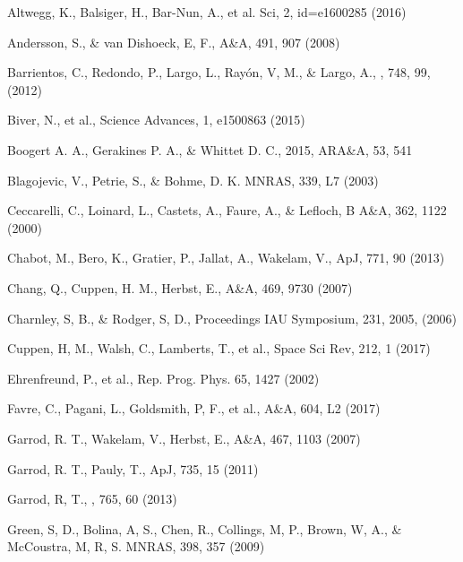 \documentclass{aastex61}
\begin{document}
\appendix


\begin{thebibliography}{}

 Altwegg, K., Balsiger, H., Bar-Nun, A., et al. Sci, 2, id=e1600285 (2016)

 Andersson, S., \& van Dishoeck, E, F., A\&A, 491, 907 (2008)

 Barrientos, C., Redondo, P., Largo, L., Ray\'{o}n, V, M., \& Largo, A., \apj, 748, 99, (2012)

 Biver, N., et al., Science Advances, 1, e1500863 (2015)

 Boogert A. A., Gerakines P. A., \& Whittet D. C., 2015, ARA\&A, 53, 541

 Blagojevic, V., Petrie, S., \& Bohme, D. K. MNRAS, 339, L7 (2003)

 Ceccarelli, C., Loinard, L., Castets, A., Faure, A., \& Lefloch, B A\&A, 362, 1122 (2000)

 Chabot, M., Bero, K., Gratier, P., Jallat, A., Wakelam, V., ApJ, 771, 90 (2013)

 Chang, Q., Cuppen, H. M., Herbst, E., A\&A, 469, 9730 (2007)

 Charnley, S, B., \& Rodger, S, D., Proceedings IAU Symposium, 231, 2005, (2006)

 Cuppen, H, M., Walsh, C., Lamberts, T., et al., Space Sci Rev, 212, 1 (2017)

 Ehrenfreund, P., et al., Rep. Prog. Phys. 65, 1427 (2002)

 Favre, C., Pagani, L., Goldsmith, P, F., et al., A\&A, 604, L2 (2017)

 Garrod, R. T., Wakelam, V., Herbst, E., A\&A, 467, 1103 (2007)

 Garrod, R. T., Pauly, T., ApJ, 735, 15 (2011)

 Garrod, R, T., \apj, 765, 60 (2013)

 Green, S, D., Bolina, A, S., Chen, R., Collings, M, P., Brown, W, A., \& McCoustra, M, R, S. MNRAS, 398, 357 (2009)


\end{thebibliography}
\end{document}

